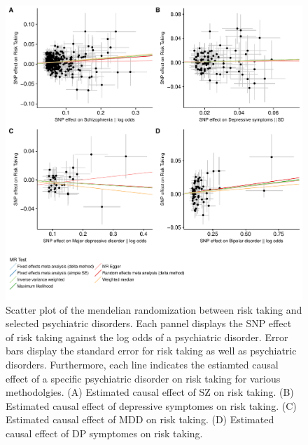 \begin{figure}[htpb]
  \centering
  \includegraphics[width=0.8\linewidth]{./figures/mr_risk.pdf}
  \caption{
    Scatter plot of the mendelian randomization between risk taking and selected psychiatric disorders.
    Each pannel displays the SNP effect of risk taking against the log odds of a psychiatric disorder.
    Error bars display the standard error for risk taking as well as psychiatric disorders.
    Furthermore, each line indicates the estiamted causal effect of a specific psychiatric disorder on risk taking for various methodolgies.
    (A) Estimated causal effect of SZ on risk taking.
    (B) Estimated causal effect of depressive symptomes on risk taking.
    (C) Estimated causal effect of MDD on risk taking.
    (D) Estimated causal effect of DP symptomes on risk taking.
  }\label{fig:mr_risk}
\end{figure}
